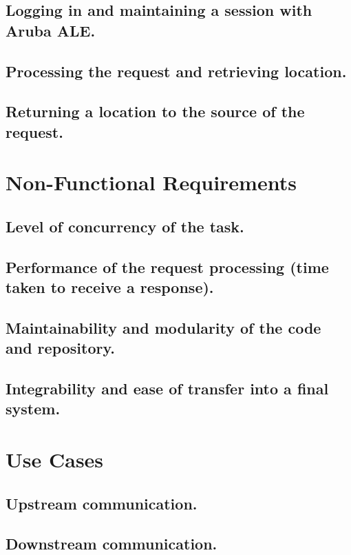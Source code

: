\documentclass{article}
\begin{document}
\subsection{Logging in and maintaining a session with Aruba ALE.}

\subsection{Processing the request and retrieving location.}

\subsection{Returning a location to the source of the request.}


\section{Non-Functional Requirements}

\subsection{Level of concurrency of the task.}

\subsection{Performance of the request processing (time taken to receive a response).}

\subsection{Maintainability and modularity of the code and repository.}

\subsection{Integrability and ease of transfer into a final system.}


\section{Use Cases}

\subsection{Upstream communication.}

\subsection{Downstream communication.}
\end{document}

